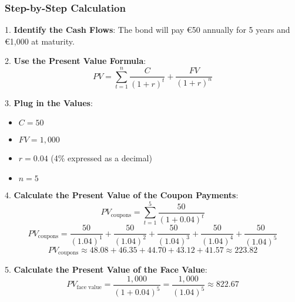 \documentclass{article}
\begin{document}
\subsubsection{Step-by-Step Calculation}

1. \textbf{Identify the Cash Flows}:
   The bond will pay €50 annually for 5 years and €1,000 at maturity.

2. \textbf{Use the Present Value Formula}:
   \[
   PV = \sum_{t=1}^{n} \frac{C}{(1 + r)^t} + \frac{FV}{(1 + r)^n}
   \]

3. \textbf{Plug in the Values}:
   \begin{itemize}
       \item \( C = 50 \)
       \item \( FV = 1,000 \)
       \item \( r = 0.04 \) (4\% expressed as a decimal)
       \item \( n = 5 \)
   \end{itemize}

4. \textbf{Calculate the Present Value of the Coupon Payments}:
   \[
   PV_{\text{coupons}} = \sum_{t=1}^{5} \frac{50}{(1 + 0.04)^t}
   \]
   \[
   PV_{\text{coupons}} = \frac{50}{(1.04)^1} + \frac{50}{(1.04)^2} + \frac{50}{(1.04)^3} + \frac{50}{(1.04)^4} + \frac{50}{(1.04)^5}
   \]
   \[
   PV_{\text{coupons}} \approx 48.08 + 46.35 + 44.70 + 43.12 + 41.57 \approx 223.82
   \]

5. \textbf{Calculate the Present Value of the Face Value}:
   \[
   PV_{\text{face value}} = \frac{1,000}{(1 + 0.04)^5} = \frac{1,000}{(1.04)^5} \approx 822.67
   \]
\end{document}
